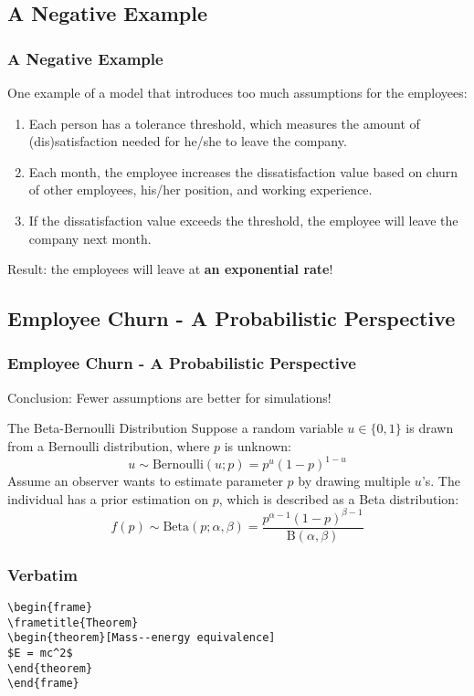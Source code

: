 \documentclass{beamer}
\begin{document}
\subsection{A Negative Example}
\begin{frame}
\frametitle{A Negative Example}
One example of a model that introduces too much assumptions for the employees:
\begin{enumerate}
\item Each person has a tolerance threshold, which measures the amount of (dis)satisfaction needed for he/she to leave the company.
\item Each month, the employee increases the dissatisfaction value based on churn of other employees, his/her position, and working experience.
\item If the dissatisfaction value exceeds the threshold, the employee will leave the company next month.
\end{enumerate}
Result: the employees will leave at {\bf an exponential rate}!
\end{frame}
\subsection{Employee Churn - A Probabilistic Perspective}

\begin{frame}
\frametitle{Employee Churn - A Probabilistic Perspective}
Conclusion: Fewer assumptions are better for simulations!
\begin{block}{The Beta-Bernoulli Distribution}
Suppose a random variable $u\in \{0,1\}$ is drawn from a Bernoulli distribution, where $p$ is unknown:
\begin{equation}
u \sim \mathrm{Bernoulli}(u;p)=p^u(1-p)^{1-u}
\end{equation}
Assume an observer wants to estimate parameter $p$ by drawing multiple $u$'s. The individual has a prior estimation on $p$, which is described as a Beta distribution:
\begin{equation}
f(p)\sim \mathrm{Beta}(p;\alpha, \beta) = \frac{p^{\alpha-1}(1-p)^{\beta-1}}{\mathrm{B}(\alpha, \beta)}
\end{equation}
\end{block}
\end{frame}




\begin{frame}[fragile] %
\frametitle{Verbatim}
\begin{example}
\begin{verbatim}
\begin{frame}
\frametitle{Theorem}
\begin{theorem}[Mass--energy equivalence]
$E = mc^2$
\end{theorem}
\end{frame}\end{verbatim}
\end{example}
\end{frame}
\end{document}
